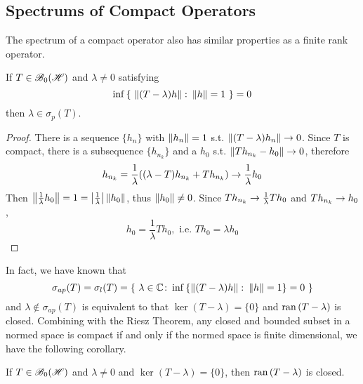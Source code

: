 \documentclass[a4paper,11pt]{report}
\begin{document}
\subsection{Spectrums of Compact Operators}

The spectrum of a compact operator also has similar properties as a finite rank operator.

\begin{thm}
	If $T \in \mathscr{B}_{0}\mathscr{(H)}$ and $\lambda \neq 0$ satisfying
	\begin{equation*}
		\operatorname{inf}{\{~\left\lVert(T-\lambda)h\right\lVert \colon \left\lVert h\right\lVert=1~\}} = 0
	\end{equation*}
	then $\lambda \in \sigma_p(T)$.
\end{thm}
\begin{proof}
	There is a sequence $\{h_n\}$ with $\left\lVert h_n\right\lVert=1$ s.t. $\left\lVert(T-\lambda)h_n\right\lVert \rightarrow 0$. Since $T$ is compact, there is a subsequence $\{h_{n_k}\}$ and a $h_0$ s.t. $\left\lVert Th_{n_k}-h_0\right\lVert \rightarrow 0$, therefore
	\begin{equation*}
		h_{n_k} = \frac{1}{\lambda}((\lambda-T)h_{n_k}+Th_{n_k}) \rightarrow \frac{1}{\lambda}h_0
	\end{equation*}
	Then $\left\lVert\frac{1}{\lambda}h_0\right\lVert=1=\left\lvert\frac{1}{\lambda}\right\lvert\left\lVert h_0\right\lVert$, thus $\left\lVert h_0\right\lVert \neq 0$. Since $Th_{n_k} \rightarrow \frac{1}{\lambda}Th_0$ and $Th_{n_k} \rightarrow h_0$,
	\begin{equation*}
		h_0 = \frac{1}{\lambda}Th_0, \text{ i.e. } Th_0 = \lambda h_0
	\end{equation*}
\end{proof}

In fact, we have known that
\begin{equation*}
	\sigma_{ap}(T) = \sigma_l(T) = \{~\lambda \in \mathbb{C} \colon \operatorname{inf}{\{\left\lVert(T-\lambda)h\right\lVert \colon \left\lVert h\right\lVert=1\}} = 0~\}
\end{equation*}
and $\lambda \notin \sigma_{ap}(T)$ is equivalent to that $\ker{(T-\lambda)} = \{0\}$ and $\operatorname{ran}{(T-\lambda)}$ is closed. Combining with the Riesz Theorem, any closed and bounded subset in a normed space is compact if and only if the normed space is finite dimensional, we have the following corollary.

\begin{cor}
	If $T \in \mathscr{B}_{0}\mathscr{(H)}$ and $\lambda \neq 0$ and $\ker{(T-\lambda)} = \{0\}$, then $\operatorname{ran}{(T-\lambda)}$ is closed.
\end{cor}
\end{document}

